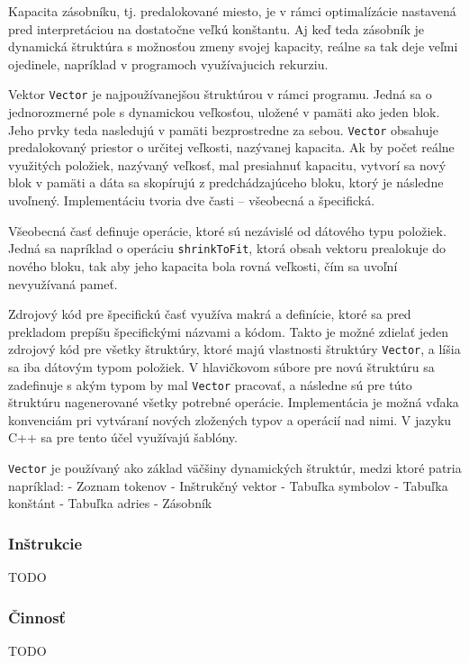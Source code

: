\documentclass[12pt,a4paper,titlepage,final]{article}
\begin{document}
Kapacita zásobníku, tj. predalokované miesto, je v rámci optimalízácie nastavená pred
interpretáciou na dostatočne veľkú konštantu. Aj keď teda zásobník je dynamická štruktúra
s možnosťou zmeny svojej kapacity, reálne sa tak deje veľmi ojedinele, napríklad v programoch
využívajucich rekurziu.

Vektor
\texttt{Vector} je najpoužívanejšou štruktúrou v rámci programu. Jedná sa o jednorozmerné pole s
dynamickou veľkosťou, uložené v pamäti ako jeden blok. Jeho prvky teda nasledujú v pamäti bezprostredne
za sebou. \texttt{Vector} obsahuje predalokovaný priestor o určitej veľkosti, nazývanej kapacita.
Ak by počet reálne využitých položiek, nazývaný veľkosť, mal presiahnuť kapacitu, vytvorí
sa nový blok v pamäti a dáta sa skopírujú z predchádzajúceho bloku, ktorý je následne uvoľnený.
Implementáciu tvoria dve časti -- všeobecná a špecifická.

Všeobecná časť definuje operácie, ktoré sú nezávislé od dátového typu položiek. Jedná sa napríklad
o operáciu \texttt{shrinkToFit}, ktorá obsah vektoru prealokuje do nového bloku, tak aby jeho
kapacita bola rovná veľkosti, čím sa uvoľní nevyužívaná pameť. 

Zdrojový kód pre špecifickú časť využíva makrá a definície, ktoré sa pred prekladom prepíšu
špecifickými názvami a kódom. Takto je možné zdielať jeden zdrojový kód pre všetky štruktúry,
ktoré majú vlastnosti štruktúry \texttt{Vector}, a líšia sa iba dátovým typom položiek. V hlavičkovom
súbore pre novú štruktúru sa zadefinuje s akým typom by mal \texttt{Vector} pracovať, 
a následne sú pre túto štruktúru nagenerované všetky potrebné operácie. Implementácia je možná vďaka
konvenciám pri vytváraní nových zložených typov a operácií nad nimi. V jazyku C++ sa pre tento účel
využívajú šablóny.

\texttt{Vector} je používaný ako základ väčšiny dynamických štruktúr, medzi ktoré patria napríklad:
- Zoznam tokenov
- Inštrukčný vektor
- Tabuľka symbolov
- Tabuľka konštánt
- Tabuľka adries
- Zásobník

\subsubsection{Inštrukcie}
TODO

\subsubsection{Činnosť}
TODO
\end{document}
